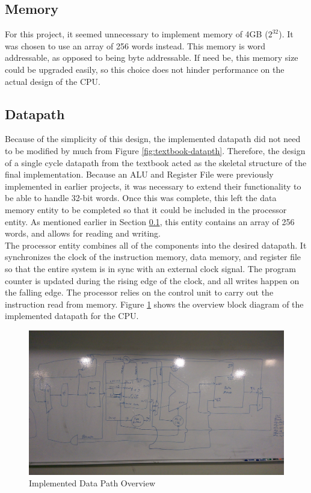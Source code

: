 \documentclass[12pt]{article}
\begin{document}
\subsection{Memory}\label{sec:memory}
For this project, it seemed unnecessary to implement memory of 4GB ($2^{32}$). It was chosen to use an array of 256 words instead. This memory is word addressable, as opposed to being byte addressable. If need be, this memory size could be upgraded easily, so this choice does not hinder performance on the actual design of the CPU.
\subsection{Datapath}
Because of the simplicity of this design, the implemented datapath did not need to be modified by much from Figure \ref{fig:textbook-datapth}. Therefore, the design of a single cycle datapath from the textbook acted as the skeletal structure of the final implementation. Because an ALU and Register File were previously implemented in earlier projects, it was necessary to extend their functionality to be able to handle 32-bit words. Once this was complete, this left the data memory entity to be completed so that it could be included in the processor entity. As mentioned earlier in Section \ref{sec:memory}, this entity contains an array of 256 words, and allows for reading and writing.
\\

\noindent The processor entity combines all of the components into the desired datapath. It synchronizes the clock of the instruction memory, data memory, and register file so that the entire system is in sync with an external clock signal. The program counter is updated during the rising edge of the clock, and all writes happen on the falling edge. The processor relies on the control unit to carry out the instruction read from memory.
Figure \ref{fig:datapth} shows the overview block diagram of the implemented datapath for the CPU.
\begin{figure}[H]
\centering
\includegraphics[width=\linewidth]{datapth}
\caption{Implemented Data Path Overview}
\label{fig:datapth}
\end{figure}
\end{document}
